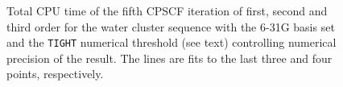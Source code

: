 \documentclass[prl,aps,twocolumn,showpacs,twocolumngrid,superbib]{revtex4}
\begin{document}
\begin{figure}[t]
  \caption{\protect
    Total CPU time of the fifth CPSCF iteration of first, second 
    and third order for the water cluster sequence with the 6-31G
    basis set and the {\tt TIGHT} numerical threshold (see text) 
    controlling numerical precision of the result. The lines
    are fits to the last three and four points, respectively.
  }\label{fig:Mix_scaling}
\end{figure}
\end{document}
